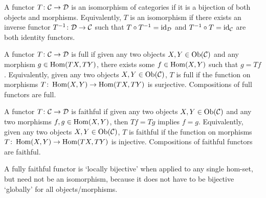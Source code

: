 \begin{definition}
    A functor \(T\colon\mathcal{C}\to\mathcal{D}\) is an isomorphism of categories
    if it is a bijection of both objects and morphisms.
    Equivalently, \(T\) is an isomorphism
    if there exists an inverse functor \(T^{-1}\colon\mathcal{D}\to\mathcal{C}\)
    such that \(T \circ T^{-1} = \operatorname{id}_{\mathcal{D}}\) and \(T^{-1} \circ T = \operatorname{id}_{\mathcal{C}}\) are both identity functors.
\end{definition}
\begin{definition}
    A functor \(T\colon\mathcal{C}\to\mathcal{D}\) is full
    if given any two objects \(X,Y \in \operatorname{Ob}(\mathcal{C})\) and any morphism \(g \in \operatorname{Hom}(TX,TY)\),
    there exists some \(f \in \operatorname{Hom}(X,Y)\) such that \(g = Tf\).
    Equivalently, given any two objects \(X,Y \in \operatorname{Ob}(\mathcal{C})\),
    \(T\) is full if the function on morphisms \(T\colon\operatorname{Hom}(X,Y)\to\operatorname{Hom}(TX,TY)\) is surjective.
    Compositions of full functors are full.
\end{definition}
\begin{definition}
    A functor \(T\colon\mathcal{C}\to\mathcal{D}\) is faithful
    if given any two objects \(X,Y \in \operatorname{Ob}(\mathcal{C})\) and any two morphisms \(f,g \in \operatorname{Hom}(X,Y)\),
    then \(Tf = Tg\) implies \(f = g\).
    Equivalently, given any two objects \(X,Y \in \operatorname{Ob}(\mathcal{C})\),
    \(T\) is faithful if the function on morphisms \(T\colon\operatorname{Hom}(X,Y)\to\operatorname{Hom}(TX,TY)\) is injective.
    Compositions of faithful functors are faithful.
\end{definition}
\begin{remark}
    A fully faithful functor is `locally bijective' when applied to any single hom-set,
    but need not be an isomorphism, because it does not have to be bijective `globally' for all objects/morphisms.
\end{remark}



